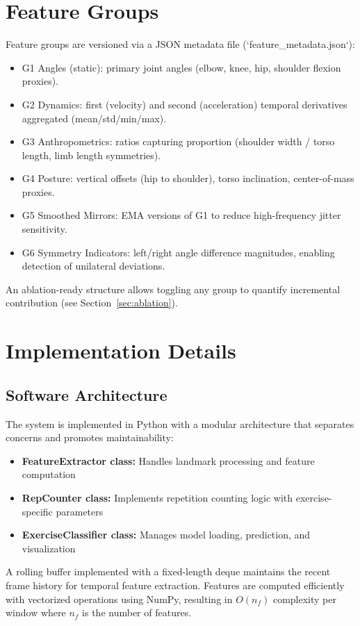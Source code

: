 \documentclass[conference]{IEEEtran}
\begin{document}
\section{Feature Groups}
Feature groups are versioned via a JSON metadata file (`feature_metadata.json`):
\begin{itemize}[leftmargin=*]
  \item G1 Angles (static): primary joint angles (elbow, knee, hip, shoulder flexion proxies).
  \item G2 Dynamics: first (velocity) and second (acceleration) temporal derivatives aggregated (mean/std/min/max).
  \item G3 Anthropometrics: ratios capturing proportion (shoulder width / torso length, limb length symmetries).
  \item G4 Posture: vertical offsets (hip to shoulder), torso inclination, center-of-mass proxies.
  \item G5 Smoothed Mirrors: EMA versions of G1 to reduce high-frequency jitter sensitivity.
  \item G6 Symmetry Indicators: left/right angle difference magnitudes, enabling detection of unilateral deviations.
\end{itemize}
An ablation-ready structure allows toggling any group to quantify incremental contribution (see Section~\ref{sec:ablation}).

\section{Implementation Details}
\subsection{Software Architecture}
The system is implemented in Python with a modular architecture that separates concerns and promotes maintainability:

\begin{itemize}
    \item \textbf{FeatureExtractor class:} Handles landmark processing and feature computation
    \item \textbf{RepCounter class:} Implements repetition counting logic with exercise-specific parameters
    \item \textbf{ExerciseClassifier class:} Manages model loading, prediction, and visualization
\end{itemize}

A rolling buffer implemented with a fixed-length deque maintains the recent frame history for temporal feature extraction. Features are computed efficiently with vectorized operations using NumPy, resulting in $O(n_f)$ complexity per window where $n_f$ is the number of features.
\end{document}
